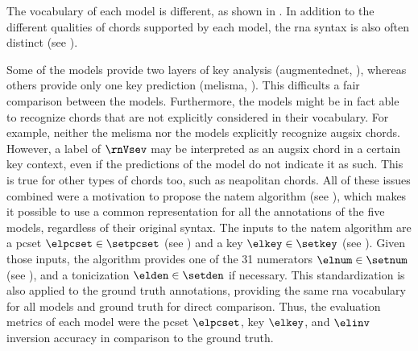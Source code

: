 
The vocabulary of each model is different, as shown in
. In addition to the different
qualities of chords supported by each model, the \gls{rna}
syntax is also often distinct (see
). 


Some of the models provide two layers of key analysis
(\gls{augmentednet}, \cite{micchi2021deep, chen2021attend}),
whereas others provide only one key prediction
(\gls{melisma}, \cite{mcleod2021modular}). This difficults a
fair comparison between the models. Furthermore, the models
might be in fact able to recognize chords that are not
explicitly considered in their vocabulary. For example,
neither the \gls{melisma} nor the
\textcite{mcleod2021modular} models explicitly recognize
\gls{augsix} chords. However, a label of $\rnVsev$ may be
interpreted as an \gls{augsix} chord in a certain key
context, even if the predictions of the model do not
indicate it as such. This is true for other types of chords
too, such as \gls{neapolitan} chords. All of these issues
combined were a motivation to propose the \gls{natem}
algorithm (see
), which
makes it possible to use a common representation for all the
annotations of the five models, regardless of their original
syntax. The inputs to the \gls{natem} algorithm are a
\gls{pcset} $\elpcset \in \setpcset$ (see
) and a key $\elkey
\in \setkey$ (see ).
Given those inputs, the algorithm provides one of the 31
numerators $\elnum \in \setnum$ (see
), and a
tonicization $\elden \in \setden$ if necessary. This
standardization is also applied to the ground truth
annotations, providing the same \gls{rna} vocabulary for all
models and ground truth for direct comparison. Thus, the
evaluation metrics of each model were the \gls{pcset}
$\elpcset$, key $\elkey$, and $\elinv$ inversion accuracy in
comparison to the ground truth.


